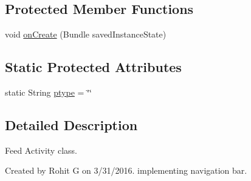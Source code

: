 \subsection*{Protected Member Functions}
\begin{DoxyCompactItemize}
\item 
void \hyperlink{classcom_1_1example_1_1sel_1_1lostfound_1_1FeedActivity_a27dee5594c91dcb9216364c9556c4af7}{on\-Create} (Bundle saved\-Instance\-State)
\end{DoxyCompactItemize}
\subsection*{Static Protected Attributes}
\begin{DoxyCompactItemize}
\item 
static String \hyperlink{classcom_1_1example_1_1sel_1_1lostfound_1_1FeedActivity_a485e807a263274d664ce60fae23ebb45}{ptype} = \char`\"{}\char`\"{}
\end{DoxyCompactItemize}


\subsection{Detailed Description}
Feed Activity class. 

Created by Rohit G on 3/31/2016. implementing navigation bar. 

